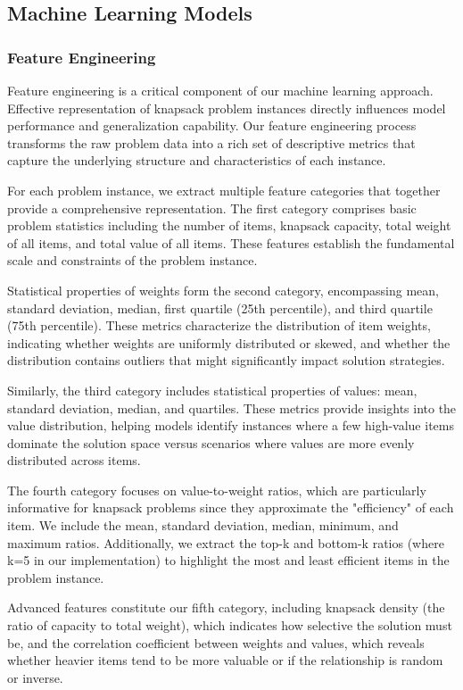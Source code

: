 \documentclass[conference, a4paper]{IEEEtran}
\begin{document}
\subsection{Machine Learning Models}
\subsubsection{Feature Engineering}
Feature engineering is a critical component of our machine learning approach. Effective representation of knapsack problem instances directly influences model performance and generalization capability. Our feature engineering process transforms the raw problem data into a rich set of descriptive metrics that capture the underlying structure and characteristics of each instance.

For each problem instance, we extract multiple feature categories that together provide a comprehensive representation. The first category comprises basic problem statistics including the number of items, knapsack capacity, total weight of all items, and total value of all items. These features establish the fundamental scale and constraints of the problem instance.

Statistical properties of weights form the second category, encompassing mean, standard deviation, median, first quartile (25th percentile), and third quartile (75th percentile). These metrics characterize the distribution of item weights, indicating whether weights are uniformly distributed or skewed, and whether the distribution contains outliers that might significantly impact solution strategies.

Similarly, the third category includes statistical properties of values: mean, standard deviation, median, and quartiles. These metrics provide insights into the value distribution, helping models identify instances where a few high-value items dominate the solution space versus scenarios where values are more evenly distributed across items.

The fourth category focuses on value-to-weight ratios, which are particularly informative for knapsack problems since they approximate the "efficiency" of each item. We include the mean, standard deviation, median, minimum, and maximum ratios. Additionally, we extract the top-k and bottom-k ratios (where k=5 in our implementation) to highlight the most and least efficient items in the problem instance.

Advanced features constitute our fifth category, including knapsack density (the ratio of capacity to total weight), which indicates how selective the solution must be, and the correlation coefficient between weights and values, which reveals whether heavier items tend to be more valuable or if the relationship is random or inverse.
\end{document}

